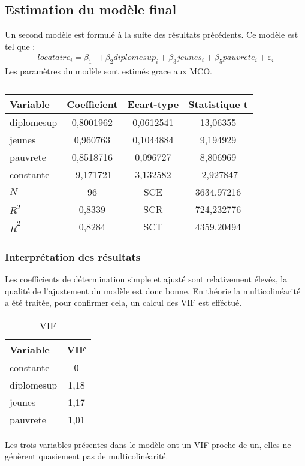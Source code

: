 \documentclass[]{article}
\begin{document}
\subsection{Estimation du modèle final}
Un second modèle est formulé à la suite des résultats précédents. Ce modèle est tel que :
\begin{equation*}
    \begin{split}
            locataire_i =  \beta_1 &+ \beta_2diplomesup_i + \beta_3jeunes_i + \beta_5pauvrete_i + \varepsilon_i 
    \end{split}
\end{equation*}
Les paramètres du modèle sont estimés grace aux MCO.
\begin{table}[H]
\centering
\caption{}
\label{table:secondeReg}
\begin{tabular}{l*{1}{ccc}}
\toprule
Variable            & Coefficient&  Ecart-type&Statistique t\\
\midrule
diplomesup&    0,8001962&    0,0612541&    13,06355\\
jeunes  &     0,960763&    0,1044884&    9,194929\\
pauvrete&    0,8518716&     0,096727&    8,806969\\
constante      &   -9,171721&    3,132582&   -2,927847\\
\midrule
$N$       &          96& SCE           &   3634,97216           \\
$R^{2}$ & 0,8339 & SCR & 724,232776   \\ 
$\bar{R}^2$ & 0,8284 & SCT & 4359,20494\\ 
\bottomrule
\end{tabular}
\end{table}
\subsubsection{Interprétation des résultats}
Les coefficients de détermination simple et ajusté sont relativement élevés, la qualité de l'ajustement du modèle est donc bonne. En théorie la
multicolinéarité a été traitée, pour confirmer cela, un calcul des VIF est efféctué.
\begin{table}[H]
\centering
\caption{VIF}
\begin{tabular}{l*{1}{c}}
\toprule
Variable            &         VIF\\
\midrule
constante & 0 \\
diplomesup & 1,18 \\
jeunes & 1,17 \\
pauvrete & 1,01 \\
\bottomrule
\end{tabular}
\end{table}
Les trois variables présentes dans le modèle ont un VIF proche de un, elles ne génèrent quasiement pas de multicolinéarité.
\end{document}
